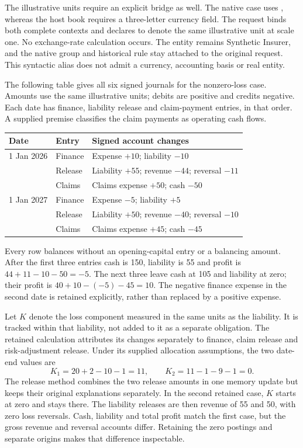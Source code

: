 The illustrative units require an explicit bridge as well. The native case
uses , whereas the host book requires a three-letter currency field.
The request binds both complete contexts and declares  to denote
the same illustrative unit at scale one. No exchange-rate calculation occurs.
The entity remains Synthetic Insurer, and the native group and historical
rule stay attached to the original request. This syntactic alias does not
admit a currency, accounting basis or real entity.

The following table gives all six signed journals for the nonzero-loss case.
Amounts use the same illustrative units; debits are positive and credits
negative. Each date has finance, liability release and claim-payment entries,
in that order. A supplied premise classifies the claim payments as operating
cash flows.
\begin{center}\small
\begin{tabular}{lll}
\toprule
Date & Entry & Signed account changes \\
\midrule
1 Jan 2026 & Finance & Expense $+10$; liability $-10$ \\
           & Release & Liability $+55$; revenue $-44$; reversal $-11$ \\
           & Claims  & Claims expense $+50$; cash $-50$ \\
1 Jan 2027 & Finance & Expense $-5$; liability $+5$ \\
           & Release & Liability $+50$; revenue $-40$; reversal $-10$ \\
           & Claims  & Claims expense $+45$; cash $-45$ \\
\bottomrule
\end{tabular}
\end{center}
Every row balances without an opening-capital entry or a balancing amount.
After the first three entries cash is 150, liability is 55 and profit is
$44+11-10-50=-5$. The next three leave cash at 105 and liability at zero;
their profit is $40+10-(-5)-45=10$. The negative finance expense in the second
date is retained explicitly, rather than replaced by a positive expense.

Let $K$ denote the loss component measured in the same units as the liability.
It is tracked within that liability, not added to it as a separate obligation.
The retained calculation attributes its changes separately to finance, claim
release and risk-adjustment release. Under its supplied allocation assumptions,
the two date-end values are
\[
  K_1=20+2-10-1=11,\qquad
  K_2=11-1-9-1=0.
\]
The release method combines the two release amounts in one memory update but
keeps their original explanations separately. In the second retained case,
$K$ starts at zero and stays there. The liability releases are then revenue
of 55 and 50, with zero loss reversals. Cash, liability and total profit match
the first case, but the gross revenue and reversal accounts differ. Retaining
the zero postings and separate origins makes that difference inspectable.

